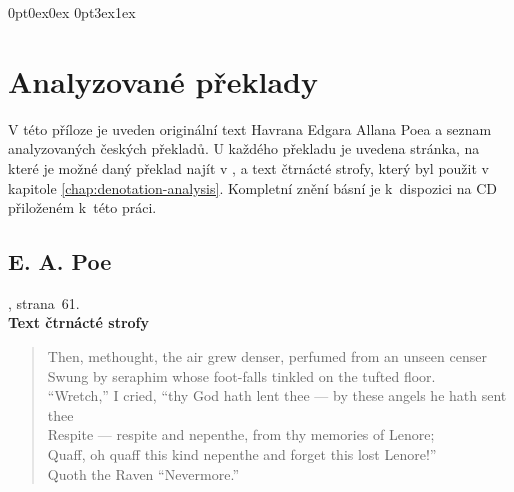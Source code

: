 \documentclass[dp.tex]{subfiles}
\begin{document}
\titleformat{\chapter}[display]
  {\normalfont\huge\bfseries}{\chaptertitlename\ \thechapter}{20pt}{\Huge}
\titlespacing*{\chapter}
{0pt}{0ex}{0ex}
\titlespacing*{\section}
{0pt}{3ex}{1ex}


\chapter{Analyzované překlady}
\label{appendix:preklady}

V této příloze je uveden originální text Havrana Edgara Allana Poea a seznam analyzovaných českých překladů. U každého překladu je uvedena stránka, na které je možné daný překlad najít v \cite{Poe1990}, a text čtrnácté strofy, který byl použit v kapitole \ref{chap:denotation-analysis}. Kompletní znění básní je k~dispozici na CD přiloženém k~této práci.

\section*{E. A. Poe}

, strana~61.
\\\textbf{Text čtrnácté strofy}
\begin{verse}
Then, methought, the air grew denser, perfumed from an unseen censer\\
Swung by seraphim whose foot-falls tinkled on the tufted floor.\\
“Wretch,” I cried, “thy God hath lent thee — by these angels he hath sent thee\\
Respite — respite and nepenthe, from thy memories of Lenore;\\
Quaff, oh quaff this kind nepenthe and forget this lost Lenore!”\\
\hspace*{0.8cm}Quoth the Raven “Nevermore.”
\end{verse}
\end{document}
